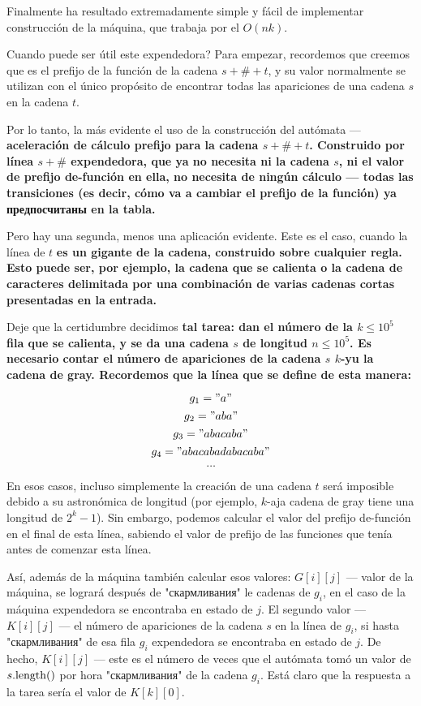Finalmente ha resultado extremadamente simple y fácil de implementar construcción de la máquina, que trabaja por el $O(n k)$.

Cuando puede ser útil este expendedora? Para empezar, recordemos que creemos que es el prefijo de la función de la cadena $s+\#+t$, y su valor normalmente se utilizan con el único propósito de encontrar todas las apariciones de una cadena $s$ en la cadena $t$.

Por lo tanto, la más evidente el uso de la construcción del autómata --- \bf{aceleración de cálculo prefijo} para la cadena $s+\#+t$. Construido por línea $s+\#$ expendedora, que ya no necesita ni la cadena $s$, ni el valor de prefijo de-función en ella, no necesita de ningún cálculo --- todas las transiciones (es decir, cómo va a cambiar el prefijo de la función) ya предпосчитаны en la tabla.

Pero hay una segunda, menos una aplicación evidente. Este es el caso, cuando la línea de $t$ \bf{es un gigante de la cadena, construido sobre cualquier regla}. Esto puede ser, por ejemplo, la cadena que se calienta o la cadena de caracteres delimitada por una combinación de varias cadenas cortas presentadas en la entrada.

Deje que la certidumbre decidimos \bf{tal tarea}: dan el número de la $k \le 10^5$ fila que se calienta, y se da una cadena $s$ de longitud $n \le 10^5$. Es necesario contar el número de apariciones de la cadena $s$ $k$-yu la cadena de gray. Recordemos que la línea que se define de esta manera:

$$ g_1 = "a" $$
$$ g_2 = "aba" $$
$$ g_3 = "abacaba" $$
$$ g_4 = "abacabadabacaba" $$
$$ \ldots $$

En esos casos, incluso simplemente la creación de una cadena $t$ será imposible debido a su astronómica de longitud (por ejemplo, $k$-aja cadena de gray tiene una longitud de $2^k-1$). Sin embargo, podemos calcular el valor del prefijo de-función en el final de esta línea, sabiendo el valor de prefijo de las funciones que tenía antes de comenzar esta línea.

Así, además de la máquina también calcular esos valores: $G[i][j]$ --- valor de la máquina, se logrará después de "скармливания" le cadenas de $g_i$, en el caso de la máquina expendedora se encontraba en estado de $j$. El segundo valor --- $K[i][j]$ --- el número de apariciones de la cadena $s$ en la línea de $g_i$, si hasta "скармливания" de esa fila $g_i$ expendedora se encontraba en estado de $j$. De hecho, $K[i][j]$ --- este es el número de veces que el autómata tomó un valor de $s.{\rm length}()$ por hora "скармливания" de la cadena $g_i$. Está claro que la respuesta a la tarea sería el valor de $K[k][0]$.


